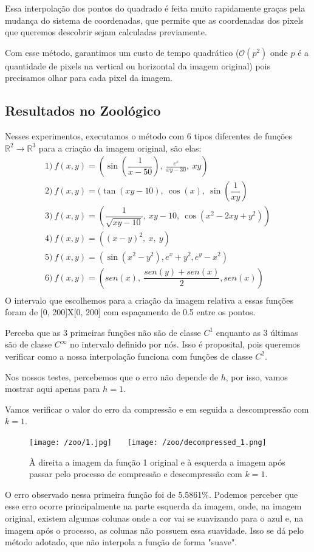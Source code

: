 \documentclass{article}
\begin{document}
	 Essa interpolação dos pontos do quadrado é feita muito rapidamente graças pela mudança do sistema de coordenadas, que permite que as coordenadas dos pixels que queremos descobrir sejam calculadas previamente. \par
	 Com esse método, garantimos um custo de tempo quadrático ($\mathcal{O}(p^2)$ onde $p$ é a quantidade de pixels na vertical ou horizontal da imagem original) pois precisamos olhar para cada pixel da imagem.
		\subsection{Resultados no Zoológico}
		Nesses experimentos, executamos o método com 6 tipos diferentes de funções $\mathbb{R}^2 \rightarrow \mathbb{R}^3$ para a criação da imagem original, são elas:
		\[
			\begin{array}{llllll}
			1)\ f(x, y) = (\sin(\dfrac{1}{x-50}),\ \frac{e^x}{xy - 30},\ xy) \\
			2)\ f(x, y) = (\tan(xy - 10),\ \cos(x),\ \sin(\dfrac{1}{xy}) \\
			3)\ f(x, y) = (\dfrac{1}{\sqrt{xy - 10}},\ xy - 10,\ \cos(x^2 - 2xy + y^2)) \\
			4)\ f(x, y) = ((x - y)^2,\ x,\ y) \\
			5)\ f(x, y) = (\sin(x^2 - y^2), e^x + y^2, e^y - x^2) \\
			6)\ f(x, y) = (sen(x),\ \dfrac{sen(y) + sen(x)}{2}, sen(x)) \\
			\end{array}
		\]
		O intervalo que escolhemos para a criação da imagem relativa a essas funções foram de [0, 200]X[0, 200] com espaçamento de 0.5 entre os pontos. \par
		Perceba que as 3 primeiras funções não são de classe $C^1$ enquanto as 3 últimas são de classe $C^\infty$ no intervalo definido por nós. Isso é proposital, pois queremos verificar como a nossa interpolação funciona com funções de classe $C^2$. \par
		Nos nossos testes, percebemos que o erro não depende de $h$, por isso, vamos mostrar aqui apenas para $h = 1$. \par
		Vamos verificar o valor do erro da compressão e em seguida a descompressão com $k = 1$.
		\pagebreak
		\begin{figure}[H]
			\centering
			\captionsetup{justification=centering}
			\texttt{[image: /zoo/1.jpg]} \ \ \
			\texttt{[image: /zoo/decompressed\_1.png]} \\
			\caption{À direita a imagem da função 1 original e à esquerda a imagem após passar pelo processo de compressão e descompressão com $k = 1$.}  
			
		\end{figure}\par
		O erro observado nessa primeira função foi de 5.5861\%. Podemos perceber que esse erro ocorre principalmente na parte esquerda da imagem, onde, na imagem original, existem algumas colunas onde a cor vai se suavizando para o azul e, na imagem após o processo, as colunas não possuem essa suavidade. Isso se dá pelo método adotado, que não interpola a função de forma "suave".
		
\end{document}
